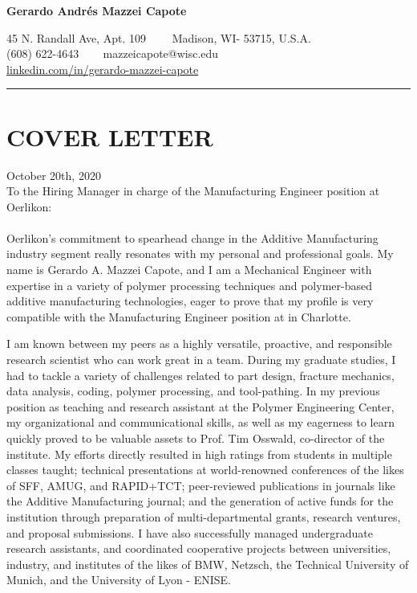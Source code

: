 \documentclass[12pt,letterpaper]{article}
\begin{document}
\begin{center}
	{\LARGE \textbf{Gerardo Andrés Mazzei Capote}}

	45 N. Randall Ave, Apt. 109\ \ \textbullet
	\ \ Madison, WI- 53715, U.S.A.
	\\
	(608) 622-4643 \ \textbullet
	\ \ mazzeicapote@wisc.edu\\
	\href{https://www.linkedin.com/in/gerardo-mazzei-capote}{linkedin.com/in/gerardo-mazzei-capote}
	
\end{center}
\vspace{-0.5em}
\hrule
\vspace{0.4em}
\vspace{-1em}

\section*{COVER LETTER}
\vspace{0.4em}
October 20th, 2020
\\
To the Hiring Manager in charge of the Manufacturing Engineer position at Oerlikon:
\\
\\
Oerlikon's commitment to spearhead change in the Additive Manufacturing industry segment really resonates with my personal and professional goals. My name is Gerardo A. Mazzei Capote, and I am a Mechanical Engineer with expertise in a variety of polymer processing techniques and polymer-based additive manufacturing technologies, eager to prove that my profile is very compatible with the Manufacturing Engineer position at in Charlotte.

I am known between my peers as a highly versatile, proactive, and responsible research scientist who can work great in a team. During my graduate studies, I had to tackle a variety of challenges related to part design, fracture mechanics, data analysis, coding, polymer processing, and tool-pathing. In my previous position as teaching and research assistant at the Polymer Engineering Center, my organizational and communicational skills, as well as my eagerness to learn quickly proved to be valuable assets to Prof. Tim Osswald, co-director of the institute. My efforts directly resulted in high ratings from students in multiple classes taught; technical presentations at world-renowned conferences of the likes of SFF, AMUG, and RAPID+TCT; peer-reviewed publications in journals like the Additive Manufacturing journal; and the generation of active funds for the institution through preparation of multi-departmental grants, research ventures, and proposal submissions. I have also successfully managed undergraduate research assistants, and coordinated cooperative projects between universities, industry, and institutes of the likes of BMW, Netzsch, the Technical University of Munich, and the University of Lyon - ENISE. 
\end{document}
